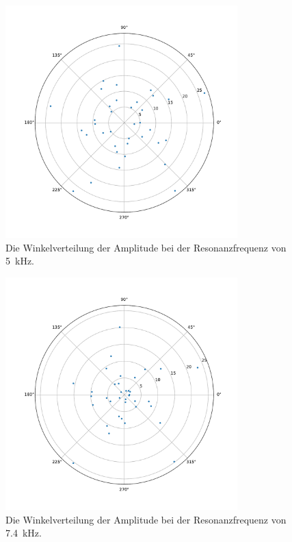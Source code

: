 \begin{figure}
    \centering
    \includegraphics[width=0.8\textwidth]{plots/C_polar4.pdf}
    \caption{Die Winkelverteilung der Amplitude bei der Resonanzfrequenz von \SI{5}{\kilo\hertz}.}
    \label{fig:polar5}
\end{figure}

\begin{figure}
    \centering
    \includegraphics[width=0.8\textwidth]{plots/C_polar3.pdf}
    \caption{Die Winkelverteilung der Amplitude bei der Resonanzfrequenz von \SI{7.4}{\kilo\hertz}.}
    \label{fig:polar74}
\end{figure}


